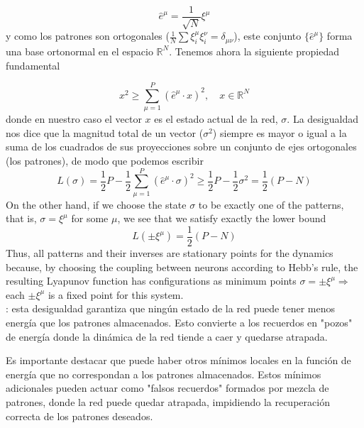 $$\hat{e}^\mu = \frac{1}{\sqrt{N}} \xi^\mu$$
y como los patrones son ortogonales ($\frac{1}{N} \sum \xi_i^\mu \xi_i^\nu = \delta_{\mu\nu}$), este conjunto $\{\hat{e}^\mu\}$ forma una base ortonormal en el espacio $\mathbb{R}^N$. Tenemos ahora la siguiente propiedad fundamental

$$x^2 \geq \sum_{\mu=1}^P (\hat{e}^\mu \cdot x)^2, \quad x \in \mathbb{R}^N$$
donde en nuestro caso el vector $x$ es el estado actual de la red, $\sigma$. La desigualdad nos dice que la magnitud total de un vector ($\sigma^2$) siempre es mayor o igual a la suma de los cuadrados de sus proyecciones sobre un conjunto de ejes ortogonales (los patrones), de modo que podemos escribir
\begin{equation*}
   L(\sigma) = \frac{1}{2} P - \frac{1}{2} \sum_{\mu=1}^{P} (\hat{e}^\mu \cdot \sigma)^2  \geq \frac{1}{2} P - \frac{1}{2} \sigma^2 = \dfrac{1}{2} (P-N)
\end{equation*}
On the other hand, if we choose the state $\sigma$ to be exactly one of the patterns, that is, $\sigma = \xi^{\mu}$ for some $\mu$, we see that we satisfy exactly the lower bound
\begin{equation*}
    L(\pm \xi^{\mu}) = \frac{1}{2} (P - N)
\end{equation*}
Thus, all patterns and their inverses are stationary points for the dynamics because, by choosing the coupling between neurons according to Hebb’s rule, the resulting Lyapunov function has configurations as minimum points $\sigma =\pm \xi^{\mu} \Rightarrow$ each $\pm\xi^{\mu}$ is a fixed point for this system. \\

\noindent
{}: esta desigualdad garantiza que ningún estado de la red puede tener menos energía que los patrones almacenados. Esto convierte a los recuerdos en "pozos" de energía donde la dinámica de la red tiende a caer y quedarse atrapada.

\begin{observacion}
    Es importante destacar que puede haber otros mínimos locales en la función de energía que no correspondan a los patrones almacenados. Estos mínimos adicionales pueden actuar como "falsos recuerdos" formados por mezcla de patrones, donde la red puede quedar atrapada, impidiendo la recuperación correcta de los patrones deseados.
\end{observacion}

